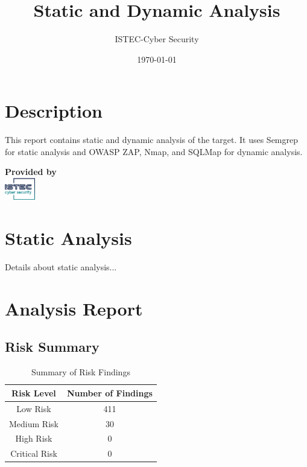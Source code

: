 \documentclass[12pt]{article}
\title{\textbf{Static and Dynamic Analysis}}
\author{ISTEC-Cyber Security}
\date{\today} %
\begin{document}
\maketitle

\section*{Description}
This report contains static and dynamic analysis of the target. It uses Semgrep for static analysis and OWASP ZAP, Nmap, and SQLMap for dynamic analysis.

\vspace{10cm} %

\begin{center}
\textbf{Provided by} \\[1em]
\includegraphics[width=0.1\textwidth]{logo75.png}
\end{center}

\newpage %

\section{Static Analysis}
Details about static analysis...

\section{Analysis Report}

\subsection{Risk Summary}
\begin{table}[h!]
\centering
\renewcommand{\arraystretch}{1.5}
\begin{tabular}{|c|c|}
\hline
\textbf{Risk Level} & \textbf{Number of Findings} \\
\hline
Low Risk & 411 \\ 
\hline
Medium Risk & 30 \\ 
\hline
High Risk & 0 \\ 
\hline
Critical Risk & 0 \\ 
\hline
\end{tabular}
\caption{Summary of Risk Findings}
\label{tab:risk_summary}
\end{table}
\end{document}
